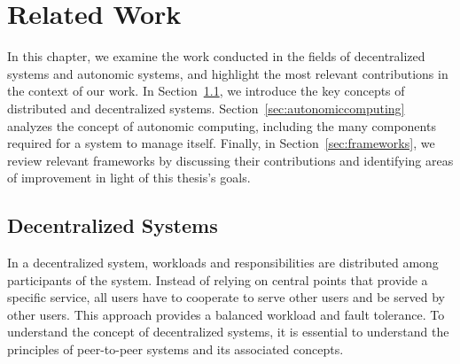 
%

\chapter{Related Work}
\label{cha:relatedwork}


\epigraphfontsize{\small\itshape}
\setlength\epigraphwidth{12.5cm}
\setlength\epigraphrule{0pt}

In this chapter, we examine the work conducted in the fields of decentralized systems and autonomic systems, and highlight the most relevant contributions in the context of our work. In Section~\ref{sec:decentralized_systems}, we introduce the key concepts of distributed and decentralized systems. Section~\ref{sec:autonomiccomputing} analyzes the concept of autonomic computing, including the many components required for a system to manage itself. Finally, in Section~\ref{sec:frameworks}, we review relevant frameworks by discussing their contributions and identifying areas of improvement in light of this thesis's goals.
%                                                            
\section{Decentralized Systems}
\label{sec:decentralized_systems}
In a decentralized system,  workloads and responsibilities are distributed among participants of the system. Instead of relying on central points that provide a specific service, all users have to cooperate to serve other users and be served by other users. This approach provides a balanced workload and fault tolerance. To understand the concept of decentralized systems, it is essential to understand the principles of peer-to-peer systems and its associated concepts.
